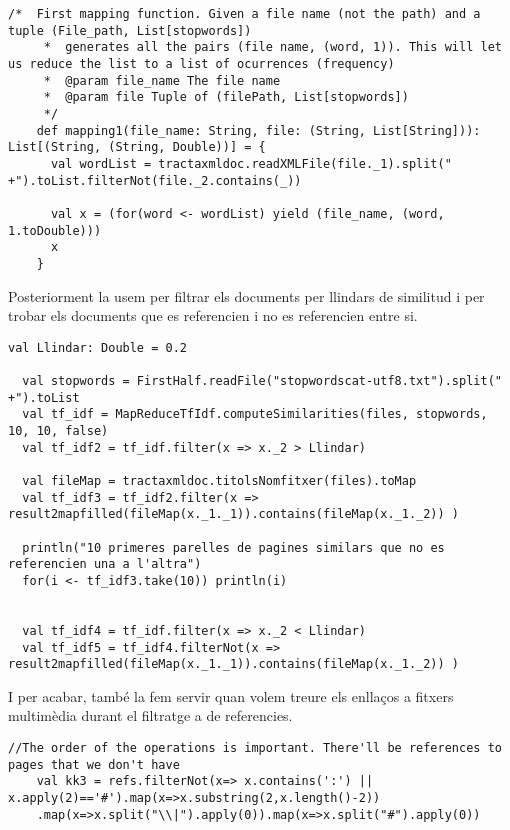 \documentclass{report}
\begin{document}
\newpage

\begin{lstlisting}[style=scalaHighlight]
/*	First mapping function. Given a file name (not the path) and a tuple (File_path, List[stopwords])
     * 	generates all the pairs (file name, (word, 1)). This will let us reduce the list to a list of ocurrences (frequency)
     * 	@param file_name The file name
     * 	@param file Tuple of (filePath, List[stopwords])
     */
    def mapping1(file_name: String, file: (String, List[String])): List[(String, (String, Double))] = {
      val wordList = tractaxmldoc.readXMLFile(file._1).split(" +").toList.filterNot(file._2.contains(_))

      val x = (for(word <- wordList) yield (file_name, (word, 1.toDouble)))
      x
    }
\end{lstlisting}

Posteriorment la usem per filtrar els documents per llindars de similitud i per trobar els documents que es referencien i no es referencien entre si.

\begin{lstlisting}[style=scalaHighlight]
  val Llindar: Double = 0.2

  val stopwords = FirstHalf.readFile("stopwordscat-utf8.txt").split(" +").toList
  val tf_idf = MapReduceTfIdf.computeSimilarities(files, stopwords, 10, 10, false)
  val tf_idf2 = tf_idf.filter(x => x._2 > Llindar)

  val fileMap = tractaxmldoc.titolsNomfitxer(files).toMap
  val tf_idf3 = tf_idf2.filter(x => result2mapfilled(fileMap(x._1._1)).contains(fileMap(x._1._2)) )

  println("10 primeres parelles de pagines similars que no es referencien una a l'altra")
  for(i <- tf_idf3.take(10)) println(i)


  val tf_idf4 = tf_idf.filter(x => x._2 < Llindar)
  val tf_idf5 = tf_idf4.filterNot(x => result2mapfilled(fileMap(x._1._1)).contains(fileMap(x._1._2)) )
\end{lstlisting}

\newpage

I per acabar, també la fem servir quan volem treure els enllaços a fitxers multimèdia durant el filtratge a de referencies.

\begin{lstlisting}[style=scalaHighlight]
//The order of the operations is important. There'll be references to pages that we don't have
	val kk3 = refs.filterNot(x=> x.contains(':') || x.apply(2)=='#').map(x=>x.substring(2,x.length()-2))
    .map(x=>x.split("\\|").apply(0)).map(x=>x.split("#").apply(0))
\end{lstlisting}
\end{document}
